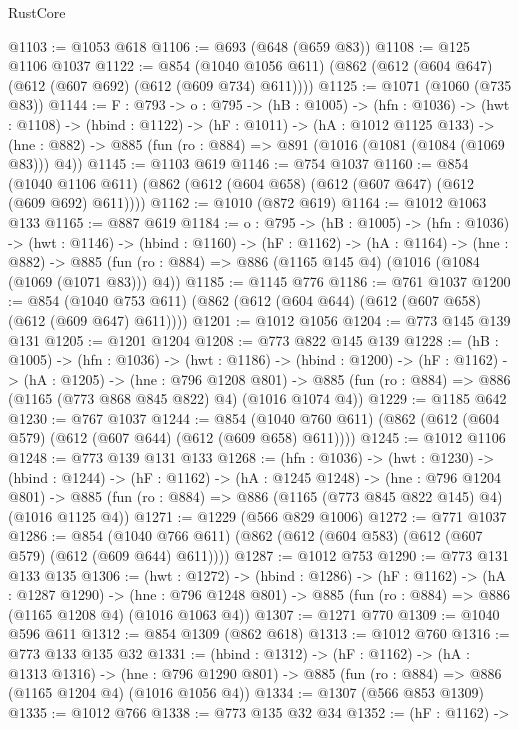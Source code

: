 \begin{lexlean}{RustCore}
\begin{coremodule}
@1103 := @1053 @618
@1106 := @693 (@648 (@659 @83))
@1108 := @125 @1106 @1037
@1122 := @854
    (@1040 @1056 @611)
    (@862 (@612 (@604 @647) (@612 (@607 @692) (@612 (@609 @734) @611))))
@1125 := @1071 (@1060 (@735 @83))
@1144 := {F : @793} ->
  {o : @795} ->
  (hB : @1005) ->
  (hfn : @1036) ->
  (hwt : @1108) ->
  (hbind : @1122) ->
  (hF : @1011) ->
  (hA : @1012 @1125 @133) ->
  (hne : @882) -> @885 (fun (ro : @884) => @891 (@1016 (@1081 (@1084 (@1069 @83))) @4))
@1145 := @1103 @619
@1146 := @754 @1037
@1160 := @854
    (@1040 @1106 @611)
    (@862 (@612 (@604 @658) (@612 (@607 @647) (@612 (@609 @692) @611))))
@1162 := @1010 (@872 @619)
@1164 := @1012 @1063 @133
@1165 := @887 @619
@1184 := {o : @795} ->
  (hB : @1005) ->
  (hfn : @1036) ->
  (hwt : @1146) ->
  (hbind : @1160) ->
  (hF : @1162) ->
  (hA : @1164) ->
  (hne : @882) ->
  @885 (fun (ro : @884) => @886 (@1165 @145 @4) (@1016 (@1084 (@1069 (@1071 @83))) @4))
@1185 := @1145 @776
@1186 := @761 @1037
@1200 := @854 (@1040 @753 @611) (@862 (@612 (@604 @644) (@612 (@607 @658) (@612 (@609 @647) @611))))
@1201 := @1012 @1056
@1204 := @773 @145 @139 @131
@1205 := @1201 @1204
@1208 := @773 @822 @145 @139
@1228 := (hB : @1005) ->
  (hfn : @1036) ->
  (hwt : @1186) ->
  (hbind : @1200) ->
  (hF : @1162) ->
  (hA : @1205) ->
  (hne : @796 @1208 @801) ->
  @885 (fun (ro : @884) => @886 (@1165 (@773 @868 @845 @822) @4) (@1016 @1074 @4))
@1229 := @1185 @642
@1230 := @767 @1037
@1244 := @854 (@1040 @760 @611) (@862 (@612 (@604 @579) (@612 (@607 @644) (@612 (@609 @658) @611))))
@1245 := @1012 @1106
@1248 := @773 @139 @131 @133
@1268 := (hfn : @1036) ->
  (hwt : @1230) ->
  (hbind : @1244) ->
  (hF : @1162) ->
  (hA : @1245 @1248) ->
  (hne : @796 @1204 @801) ->
  @885 (fun (ro : @884) => @886 (@1165 (@773 @845 @822 @145) @4) (@1016 @1125 @4))
@1271 := @1229 (@566 @829 @1006)
@1272 := @771 @1037
@1286 := @854 (@1040 @766 @611) (@862 (@612 (@604 @583) (@612 (@607 @579) (@612 (@609 @644) @611))))
@1287 := @1012 @753
@1290 := @773 @131 @133 @135
@1306 := (hwt : @1272) ->
  (hbind : @1286) ->
  (hF : @1162) ->
  (hA : @1287 @1290) ->
  (hne : @796 @1248 @801) -> @885 (fun (ro : @884) => @886 (@1165 @1208 @4) (@1016 @1063 @4))
@1307 := @1271 @770
@1309 := @1040 @596 @611
@1312 := @854 @1309 (@862 @618)
@1313 := @1012 @760
@1316 := @773 @133 @135 @32
@1331 := (hbind : @1312) ->
  (hF : @1162) ->
  (hA : @1313 @1316) ->
  (hne : @796 @1290 @801) -> @885 (fun (ro : @884) => @886 (@1165 @1204 @4) (@1016 @1056 @4))
@1334 := @1307 (@566 @853 @1309)
@1335 := @1012 @766
@1338 := @773 @135 @32 @34
@1352 := (hF : @1162) ->

\end{coremodule}
\end{lexlean}
